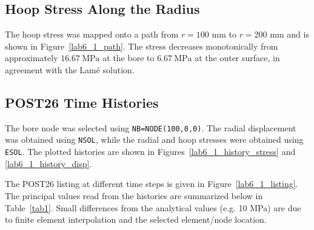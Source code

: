 \subsection{Hoop Stress Along the Radius}

The hoop stress was mapped onto a path from $r=100$ mm to $r=200$ mm and is shown in Figure~\ref{lab6_1_path}.  The stress decreases
monotonically from approximately $\SI{16.67}{\mega\pascal}$ at the bore to
$\SI{6.67}{\mega\pascal}$ at the outer surface, in agreement with the Lam\'e
solution.

\subsection{POST26 Time Histories}

The bore node was selected using \texttt{NB=NODE(100,0,0)}.  The radial
displacement was obtained using \texttt{NSOL}, while the radial and hoop
stresses were obtained using \texttt{ESOL}.  The plotted histories are shown
in Figures~\ref{lab6_1_history_stress} and \ref{lab6_1_history_disp}.

The POST26 listing at different time steps is given in
Figure~\ref{lab6_1_listing}.  The principal values read from the histories are
summarized below in Table~\ref{tab1}.  Small differences from the analytical values (e.g. 10 MPa) are due to
finite element interpolation and the selected element/node location.


